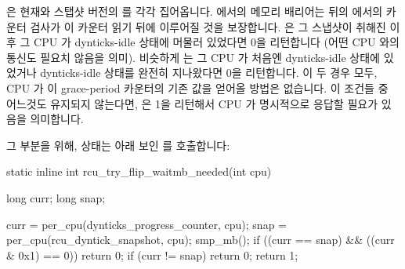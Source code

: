 \begin{fcvref}
 은 현재와 스탭샷 버전의  를
각각 집어옵니다.
 에서의 메모리 배리어는 뒤의  에서의
카운터 검사가 이 카운터 읽기 뒤에 이루어질 것을 보장합니다.
 은 그 스냅샷이 취해진 이후 그 CPU 가 dynticks-idle
상태에 머물러 있었다면 0을 리턴합니다 (어떤 CPU 와의 통신도 필요치 않음을
의미).
비슷하게  는 그 CPU 가 처음엔 dynticks-idle 상태에
있었거나 dynticks-idle 상태를 완전히 지나왔다면 0을 리턴합니다.
이 두 경우 모두, CPU 가 이 grace-period 카운터의 기존 값을 얻어올 방법은
없습니다.
이 조건들 중 어느것도 유지되지 않는다면,  은 1을 리턴해서 CPU 가
명시적으로 응답할 필요가 있음을 의미합니다.
\end{fcvref}

그 부분을 위해,  상태는 아래 보인
 를 호출합니다:

\iffalse

\begin{fcvref}[ln:formal:dyntickrcu:rcu_try_flip_waitack_needed]
\Clnref{curr,snap} pick up current and snapshot versions of
\co{dynticks_progress_counter}, respectively.
The memory barrier on \clnref{mb} ensures that the counter checks
in the later \co{rcu_try_flip_waitzero_state} follow
the fetches of these counters.
\Clnref{chk_remain,ret_0_r} return zero
(meaning no communication with the
specified CPU is required) if that CPU has remained in dynticks-idle
state since the time that the snapshot was taken.
Similarly, \clnref{chk_idle,ret_0_i} return zero
if that CPU was initially
in dynticks-idle state or if it has completely passed through a
dynticks-idle state.
In both these cases, there is no way that the CPU could have retained
the old value of the grace-period counter.
If neither of these conditions hold, \clnref{ret_1} returns one, meaning
that the CPU needs to explicitly respond.
\end{fcvref}

For its part, the \co{rcu_try_flip_waitmb_state} state
invokes \co{rcu_try_flip_waitmb_needed()}, shown below:

\fi

\begin{fcvlabel}
\begin{VerbatimN}[commandchars=\\\[\]]
static inline int
rcu_try_flip_waitmb_needed(int cpu)
{
	long curr;
	long snap;

	curr = per_cpu(dynticks_progress_counter, cpu);
	snap = per_cpu(rcu_dyntick_snapshot, cpu);
	smp_mb();
	if ((curr == snap) && ((curr & 0x1) == 0))
		return 0;
	if (curr != snap)		
		return 0;		\lnlbl[ret_0]
	return 1;
}
\end{VerbatimN}
\end{fcvlabel}


